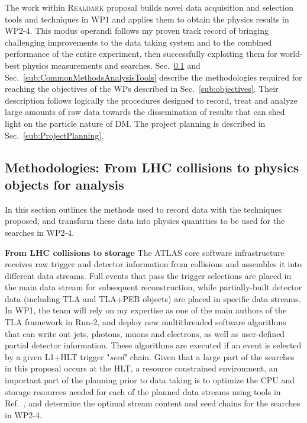 The work within \textsc{Realdark} proposal builds novel data acquisition and selection tools and techniques in WP1 and applies them to obtain the physics results in WP2-4. This modus operandi follows my proven track record of bringing challenging improvements to the data taking system and to the combined performance of the entire experiment, then successfully exploiting them for world-best physics measurements and searches. 
Sec.~\ref{subsub:TriggerRecoSoftware} and Sec.~\ref{sub:CommonMethodsAnalysisTools} describe the methodologies required for reaching the objectives of the WPs described in Sec.~\ref{sub:objectives}. 
Their description follows logically the procedures designed to record, treat and analyze large amounts of raw data towards the dissemination of results that can shed light on the particle nature of DM. %
The project planning is described in Sec.~\ref{sub:ProjectPlanning}.  

\subsection{Methodologies: From LHC collisions to physics objects for analysis}
\label{subsub:TriggerRecoSoftware}

In this section outlines the methods used to record data with the techniques proposed, 
and transform these data into physics quantities to be used for the searches in WP2-4. 

\textbf{From LHC collisions to storage} The ATLAS core software infrastructure receives raw trigger and detector information from collisions and assembles it into different data streams. 
Full events that pass the trigger selections are placed in the main data stream for subsequent reconstruction, while partially-built detector data (including TLA and TLA+PEB objects) are placed in specific data streams. 
In WP1, the team will rely on my expertise as one of the main authors of the TLA framework in Run-2, and deploy new multithreaded software algorithms that can write out jets, photons, muons and electrons, as well as user-defined partial detector information. 
These algorithms are executed if an event is selected by a given L1+HLT trigger "\textit{seed}" chain. 
Given that a large part of the searches in this proposal occurs at the HLT, a resource constrained environment, an important part of the planning prior to data taking is to optimize the CPU and storage resources needed for each of the planned data streams using tools in Ref.~\cite{ToBeCited}, %
and determine the optimal stream content and seed chains for the searches in WP2-4. 

